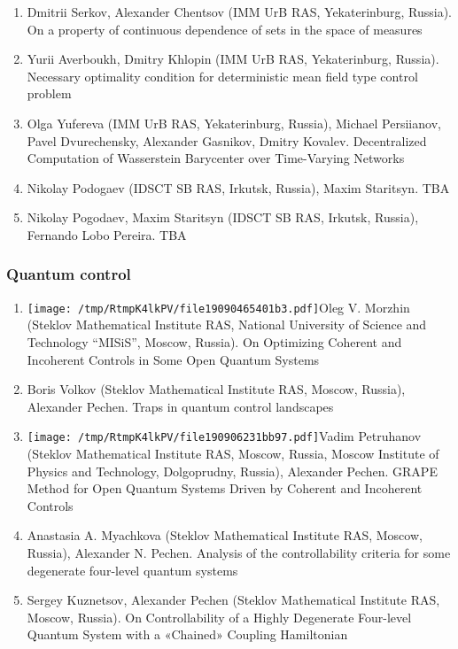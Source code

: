 \documentclass[
]{article}
\providecommand{\tightlist}{%
  \setlength{\itemsep}{0pt}\setlength{\parskip}{0pt}}
\begin{document}
\begin{enumerate}
\def\labelenumi{\arabic{enumi}.}
\tightlist
\item
  Dmitrii Serkov, Alexander Chentsov (IMM UrB RAS, Yekaterinburg,
  Russia). On a property of continuous dependence of sets in the space
  of measures
\item
  Yurii Averboukh, Dmitry Khlopin (IMM UrB RAS, Yekaterinburg, Russia).
  Necessary optimality condition for deterministic mean field type
  control problem
\item
  Olga Yufereva (IMM UrB RAS, Yekaterinburg, Russia), Michael
  Persiianov, Pavel Dvurechensky, Alexander Gasnikov, Dmitry Kovalev.
  Decentralized Computation of Wasserstein Barycenter over Time-Varying
  Networks
\item
  Nikolay Podogaev (IDSCT SB RAS, Irkutsk, Russia), Maxim Staritsyn. TBA
\item
  Nikolay Pogodaev, Maxim Staritsyn (IDSCT SB RAS, Irkutsk, Russia),
  Fernando Lobo Pereira. TBA
\end{enumerate}

\hypertarget{qc}{%
\subsubsection{Quantum control}\label{qc}}

\begin{enumerate}
\def\labelenumi{\arabic{enumi}.}
\tightlist
\item
  \protect\texttt{[image: /tmp/RtmpK4lkPV/file19090465401b3.pdf]}Oleg
  V. Morzhin (Steklov Mathematical Institute RAS, National University of
  Science and Technology ``MISiS'', Moscow, Russia). On Optimizing
  Coherent and Incoherent Controls in Some Open Quantum Systems
\item
  Boris Volkov (Steklov Mathematical Institute RAS, Moscow, Russia),
  Alexander Pechen. Traps in quantum control landscapes
\item
  \protect\texttt{[image: /tmp/RtmpK4lkPV/file190906231bb97.pdf]}Vadim
  Petruhanov (Steklov Mathematical Institute RAS, Moscow, Russia, Moscow
  Institute of Physics and Technology, Dolgoprudny, Russia), Alexander
  Pechen. GRAPE Method for Open Quantum Systems Driven by Coherent and
  Incoherent Controls
\item
  Anastasia A. Myachkova (Steklov Mathematical Institute RAS, Moscow,
  Russia), Alexander N. Pechen. Analysis of the controllability criteria
  for some degenerate four-level quantum systems
\item
  Sergey Kuznetsov, Alexander Pechen (Steklov Mathematical Institute
  RAS, Moscow, Russia). On Controllability of a Highly Degenerate
  Four-level Quantum System with a «Chained» Coupling Hamiltonian
\end{enumerate}
\end{document}
